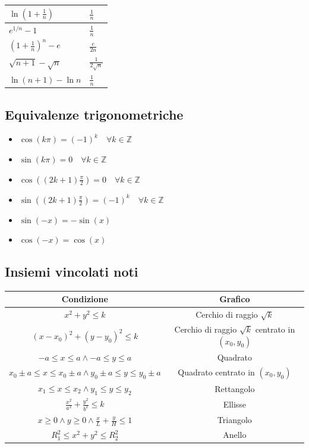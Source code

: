 \documentclass[10pt, a4paper]{article}
\begin{document}
\begin{center}
\begin{tabular}{|ll|}
                \hline
                $\displaystyle\ln\left(1+\frac{1}{n}\right)$ & $\displaystyle\frac{1}{n}$ \\
                \hline
                $\displaystyle e^{1/n} - 1$ & $\displaystyle\frac{1}{n}$ \\
                \hline
                $\displaystyle\left(1+\frac{1}{n}\right)^n - e$ & $\displaystyle\frac{e}{2n}$ \\
                \hline
                $\displaystyle\sqrt{n+1} - \sqrt{n}$ & $\displaystyle\frac{1}{2\sqrt{n}}$ \\
                \hline
                $\displaystyle\ln(n+1) - \ln n$ & $\displaystyle\frac{1}{n}$ \\
                \hline
            \end{tabular}
        \end{center}
    \subsection{Equivalenze trigonometriche}
        \begin{itemize}
            \item $\cos(k\pi) = (-1)^k \quad \forall k \in \mathbb{Z}$
            \item $\sin(k\pi) = 0 \quad \forall k \in \mathbb{Z}$
            \item $\cos((2k+1)\frac{\pi}{2}) = 0 \quad \forall k \in \mathbb{Z}$
            \item $\sin((2k+1)\frac{\pi}{2}) = (-1)^k \quad \forall k \in \mathbb{Z}$
            \item $\sin(-x)=-\sin(x)$
            \item $\cos(-x)=\cos(x)$
        \end{itemize}
    \subsection{Insiemi vincolati noti}
    \begin{tabular}{|c|c|}
        \hline
        \textbf{Condizione} & \textbf{Grafico}\\
        \hline
        $x^2+y^2\leq k$ & Cerchio di raggio $\sqrt{k}$\\
        \hline
        $(x-x_0)^2+(y-y_0)^2\leq k$ & Cerchio di raggio $\sqrt{k}$ centrato in $(x_0,y_0)$\\
        \hline
        $-a\leq x \leq a \land -a\leq y\leq a$ & Quadrato\\
        \hline
        $x_0\pm a\leq x \leq x_0\pm a \land y_0\pm a\leq y\leq y_0\pm a$ & Quadrato centrato in $(x_0,y_0)$\\
        \hline
        $x_1\leq x \leq x_2\land y_1\leq y\leq y_2$ & Rettangolo\\
        \hline
        $\frac{x^2}{a^2}+\frac{y^2}{b^2}\leq k$ & Ellisse\\
        \hline
        $\displaystyle x\geq 0\land y\geq 0\land \frac{x}{L}+\frac{y}{H}\leq 1$ & Triangolo\\
        \hline
        $R_1^2\leq x^2+y^2\leq R_2^2$ & Anello\\
        \hline
    \end{tabular}
\end{document}
